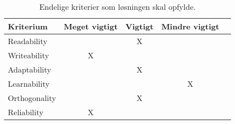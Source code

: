 \begin{table}[H]
\centering
{}
\begin{tabular}{l c c c c}
\toprule
\textbf{Kriterium} & \textbf{Meget vigtigt} & \textbf{Vigtigt} & \textbf{Mindre vigtigt}  \\ \midrule
Readability        &   & X &       \\ 
Writeability       & X &   &       \\ 
Adaptability       &   & X &       \\ 
Learnability       &   &   & X     \\ 
Orthogonality      &   & X &       \\ 
Reliability        & X &   &       \\ \bottomrule
\end{tabular}
\caption{Endelige kriterier som løsningen skal opfylde.}
\label{table:kriterier}
\end{table}